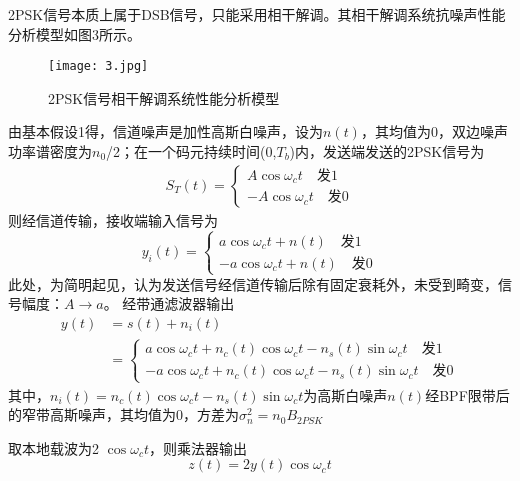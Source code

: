 \documentclass[bwprint]{gmcmthesis}
\numberwithin{equation}{section}
\begin{document}
2PSK信号本质上属于DSB信号，只能采用相干解调。其相干解调系统抗噪声性能分析模型如图3所示。

\begin{figure}[htbp]
	\centering
	\texttt{[image: 3.jpg]}
	\caption{2PSK信号相干解调系统性能分析模型}
\end{figure}
由基本假设1得，信道噪声是加性高斯白噪声，设为$n(t)$，其均值为0，双边噪声功率谱密度为$n_{0}$/2；在一个码元持续时间(0,$T_{b}$)内，发送端发送的2PSK信号为
\begin{equation}
\begin{aligned}
S_{T}(t)=\left\{\begin{array}{c}{A \cos \omega_{c} t} \quad \mbox{发1} \\ {-A \cos \omega_{c} t}\quad \mbox{发0}\end{array}\right.
\end{aligned}
\end{equation}
则经信道传输，接收端输入信号为
\begin{equation}
y_{i}(t)=\left\{\begin{array}{c}{a \cos \omega_{c} t+n(t)} \quad \mbox{发1}\\ {-a \cos \omega_{c} t+n(t)}\quad \mbox{发0}\end{array}\right.
\end{equation}
此处，为简明起见，认为发送信号经信道传输后除有固定衰耗外，未受到畸变，信号幅度：$A\rightarrow a$。
经带通滤波器输出
\begin{equation}
\begin{aligned}
y(t)&=s(t)+n_{i}(t) \\ &=\left\{\begin{array}{c}{a \cos \omega_{c} t+n_{c}(t) \cos \omega_{c} t-n_{s}(t) \sin \omega_{c} t} \quad \mbox{发1}\\ {-a \cos \omega_{c} t+n_{c}(t) \cos \omega_{c} t-n_{s}(t) \sin \omega_{c} t}\quad \mbox{发0}\end{array}\right.
\end{aligned}
\end{equation}
其中，$n_{i}(t)=n_{c}(t) \cos \omega_{c} t-n_{s}(t) \sin \omega_{c} t$为高斯白噪声$n(t)$经BPF限带后的窄带高斯噪声，其均值为0，方差为$\sigma_{n}^{2}=n_{0} B_{2 P S K}$

取本地载波为2 $\cos \omega_{c} t$，则乘法器输出
\begin{equation}
z(t)=2 y(t) \cos \omega_{c} t\label{multiplierOutput}
\end{equation}
\end{document}
